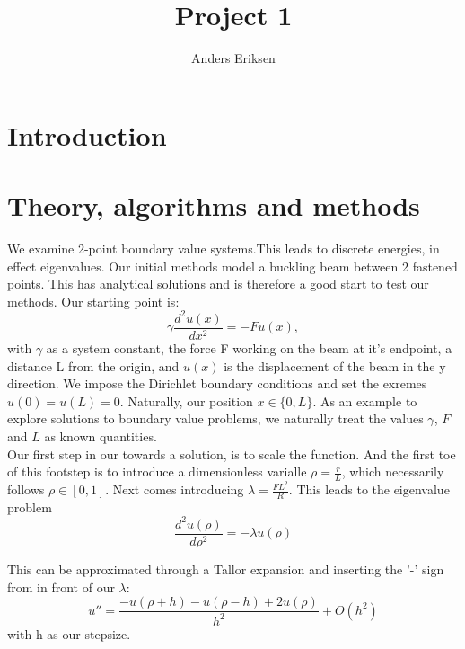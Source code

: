 \documentclass[10pt, twocolumn]{article}
\begin{document}
\title{Project 1}
\author{Anders Eriksen}

\maketitle

\begin{abstract}

\end{abstract}

\section{Introduction}

\section{Theory, algorithms and methods}
We examine  2-point boundary value systems.This leads to discrete energies, in effect eigenvalues. 
Our initial methods model a buckling beam between 2 fastened points. This has analytical solutions 
and is therefore a good start to test our methods. Our starting point is\cite{project2pdf}:
\[
\gamma \frac{d^2 u(x)}{dx^2} = -F u(x),
\]
with $\gamma$ as a system constant, the force F working on the beam at it's endpoint, a distance L 
from the origin, and $u(x)$ is the displacement of the beam in the y direction. We impose the 
Dirichlet boundary conditions and set the exremes $u(0) = u(L) = 0$. Naturally, our position 
$x \in \{ 0, L \}$. As an example to explore solutions to boundary value problems, we naturally 
treat the values $\gamma$, $F$ and $L$ as known quantities. \\

Our first step in our towards a solution, is to scale the function. And the first toe of this 
footstep is to introduce a dimensionless varialle $ \rho = \frac{r}{L} $, which necessarily follows 
$\rho \in [0,1]$. Next comes introducing $\lambda = \frac{FL^2}{R}$. This leads to the eigenvalue 
problem
\[
\frac{d^2u(\rho )}{d\rho^2} = -\lambda u(\rho)
\]

This can be approximated through a Tallor expansion and inserting the '-' sign from in front of our 
$\lambda$:
\[
u'' = \frac{-u(\rho + h) - u(\rho - h) + 2u(\rho)}{h^2} + {O}(h^2)
\]
with h as our stepsize.
\end{document}
